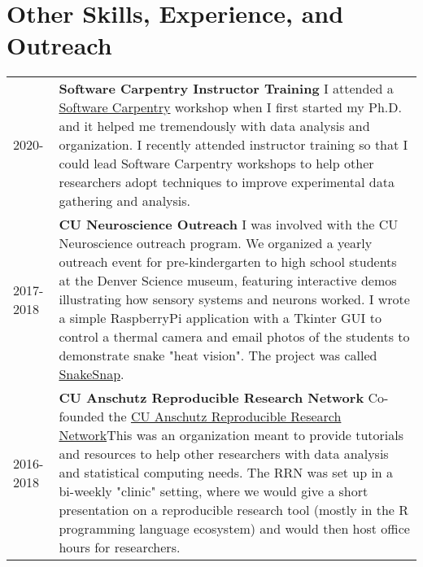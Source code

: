 \documentclass[11pt]{article}
\begin{document}
\section*{Other Skills, Experience, and Outreach}
\label{sec:orgeddfa25}
\begin{tabular}{lp{}}
2020-& \textbf{Software Carpentry Instructor Training} \newline I attended a \href{https://software-carpentry.org/}{Software Carpentry} workshop when I first started my Ph.D. and it helped me tremendously with data analysis and organization. I recently attended instructor training so that I could lead Software Carpentry workshops to help other researchers adopt techniques to improve experimental data gathering and analysis.\\
2017-2018& \textbf{CU Neuroscience Outreach}\newline
I was involved with the CU Neuroscience outreach program. We organized a yearly outreach event for pre-kindergarten to high school students at the Denver Science museum, featuring interactive demos illustrating how sensory systems and neurons worked. I wrote a simple RaspberryPi application with a Tkinter GUI to control a thermal camera and email photos of the students to demonstrate snake "heat vision". The project was called \href{https://github.com/nkicg6/thermalsnap}{SnakeSnap}.\\
2016-2018& \textbf{CU Anschutz Reproducible Research Network} \newline Co-founded the \href{https://ucd-reproducible-research-clinic.github.io/members.html}{CU Anschutz Reproducible Research Network}\newline This was an organization meant to provide tutorials and resources to help other researchers with data analysis and statistical computing needs. The RRN was set up in a bi-weekly "clinic" setting, where we would give a short presentation on a reproducible research tool (mostly in the R programming language ecosystem) and would then host office hours for researchers.\\
\end{tabular}
\end{document}
